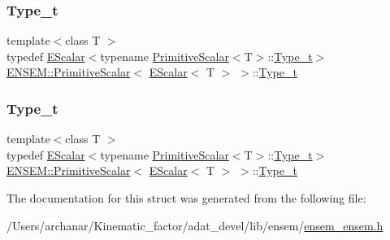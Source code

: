 \subsubsection{\texorpdfstring{Type\_t}{Type\_t}\hspace{0.1cm}{\footnotesize\ttfamily [1/2]}}
{\footnotesize\ttfamily template$<$class T $>$ \\
typedef \mbox{\hyperlink{classENSEM_1_1EScalar}{E\+Scalar}}$<$typename \mbox{\hyperlink{structENSEM_1_1PrimitiveScalar}{Primitive\+Scalar}}$<$T$>$\+::\mbox{\hyperlink{structENSEM_1_1PrimitiveScalar_3_01EScalar_3_01T_01_4_01_4_ae8493f2baf01f4ada1e2aec48076b72d}{Type\+\_\+t}}$>$ \mbox{\hyperlink{structENSEM_1_1PrimitiveScalar}{E\+N\+S\+E\+M\+::\+Primitive\+Scalar}}$<$ \mbox{\hyperlink{classENSEM_1_1EScalar}{E\+Scalar}}$<$ T $>$ $>$\+::\mbox{\hyperlink{structENSEM_1_1PrimitiveScalar_3_01EScalar_3_01T_01_4_01_4_ae8493f2baf01f4ada1e2aec48076b72d}{Type\+\_\+t}}}

\mbox{\label{structENSEM_1_1PrimitiveScalar_3_01EScalar_3_01T_01_4_01_4_ae8493f2baf01f4ada1e2aec48076b72d}} 
\subsubsection{\texorpdfstring{Type\_t}{Type\_t}\hspace{0.1cm}{\footnotesize\ttfamily [2/2]}}
{\footnotesize\ttfamily template$<$class T $>$ \\
typedef \mbox{\hyperlink{classENSEM_1_1EScalar}{E\+Scalar}}$<$typename \mbox{\hyperlink{structENSEM_1_1PrimitiveScalar}{Primitive\+Scalar}}$<$T$>$\+::\mbox{\hyperlink{structENSEM_1_1PrimitiveScalar_3_01EScalar_3_01T_01_4_01_4_ae8493f2baf01f4ada1e2aec48076b72d}{Type\+\_\+t}}$>$ \mbox{\hyperlink{structENSEM_1_1PrimitiveScalar}{E\+N\+S\+E\+M\+::\+Primitive\+Scalar}}$<$ \mbox{\hyperlink{classENSEM_1_1EScalar}{E\+Scalar}}$<$ T $>$ $>$\+::\mbox{\hyperlink{structENSEM_1_1PrimitiveScalar_3_01EScalar_3_01T_01_4_01_4_ae8493f2baf01f4ada1e2aec48076b72d}{Type\+\_\+t}}}



The documentation for this struct was generated from the following file\+:\begin{DoxyCompactItemize}
\item 
/\+Users/archanar/\+Kinematic\+\_\+factor/adat\+\_\+devel/lib/ensem/\mbox{\hyperlink{lib_2ensem_2ensem__ensem_8h}{ensem\+\_\+ensem.\+h}}\end{DoxyCompactItemize}
